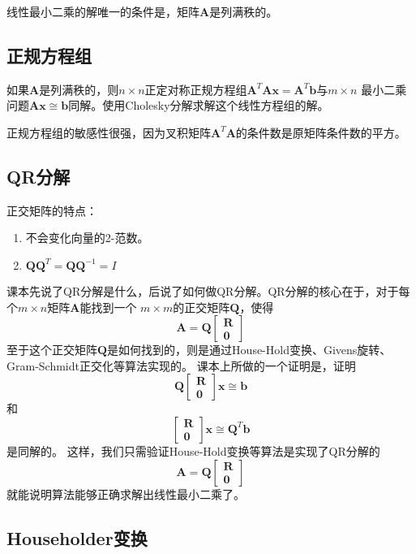 \documentclass[14pt, letterpaper, UTF8, fontset=windowsnew, heading=true]{article}
\begin{document}
\par
线性最小二乘的解唯一的条件是，矩阵$\bm{A}$是列满秩的。

\subsection{正规方程组}

如果$\bm{A}$是列满秩的，则$n\times n$正定对称正规方程组$\bm{A}^T\bm{Ax}=\bm{A}^T\bm{b}$与$m\times n$
最小二乘问题$\bm{Ax}\cong\bm{b}$同解。使用Cholesky分解求解这个线性方程组的解。

\par
正规方程组的敏感性很强，因为叉积矩阵$\bm{A}^T\bm{A}$的条件数是原矩阵条件数的平方。

\subsection{QR分解}
正交矩阵的特点：
\begin{enumerate}
\item
不会变化向量的2-范数。
\item
$\bm{QQ}^T=\bm{QQ}^{-1}=I$
\end{enumerate}
\par
课本先说了QR分解是什么，后说了如何做QR分解。QR分解的核心在于，对于每个$m\times n$矩阵$\bm{A}$能找到一个
$m\times m$的正交矩阵$\bm{Q}$，使得
$$\bm{A}=\bm{Q}\begin{bmatrix}\bm{R}\\ \bm{0}\end{bmatrix}$$
至于这个正交矩阵$\bm{Q}$是如何找到的，则是通过House-Hold变换、Givens旋转、Gram-Schmidt正交化等算法实现的。
课本上所做的一个证明是，证明
$$\bm{Q}\begin{bmatrix}\bm{R}\\ \bm{0}\end{bmatrix}\bm{x}\cong\bm{b}$$和
$$\begin{bmatrix}\bm{R}\\ \bm{0}\end{bmatrix}\bm{x}\cong\bm{Q}^T\bm{b}$$
是同解的。
这样，我们只需验证House-Hold变换等算法是实现了QR分解的
$$\bm{A}=\bm{Q}\begin{bmatrix}\bm{R}\\ \bm{0}\end{bmatrix}$$
就能说明算法能够正确求解出线性最小二乘了。

\subsection{Householder变换}
\end{document}
